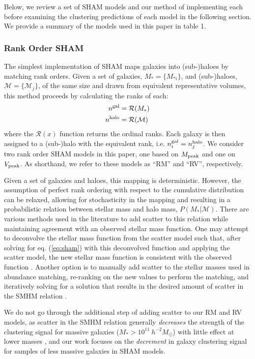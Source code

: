 \documentclass[useAMS,fleqn,usenatbib]{mnras}
\begin{document}
Below, we review a set of SHAM models and our method of implementing each before examining the clustering predictions of each model in the following section.  We provide a summary of the models used in this paper in table 1.


\subsubsection{Rank Order SHAM}
\label{sec:rank_sham}

The simplest implementation of SHAM maps galaxies into (sub-)haloes by matching rank orders.  Given a set of galaxies, $M_*=\{M_{*i}\}$, and (sub-)haloes, $\mathcal{M}=\{\mathcal{M}_j\}$, of the same size and drawn from equivalent representative volumes, this method proceeds by calculating the ranks of each:
%
\begin{align}
n^{\rm gal} &= \mathcal{R}(M_*) \nonumber \\
n^{\rm halo} &= \mathcal{R}(\mathcal{M})
\end{align}
%
where the $\mathcal{R}(x)$ function returns the ordinal ranks.  Each galaxy is then assigned to a (sub-)halo with the equivalent rank, i.e. $n_i^{\rm gal}=n_j^{\rm halo}$.  We consider two rank order SHAM models in this paper, one based on $M_{\rm peak}$ and one on $V_{\rm peak}$.  As shorthand, we refer to these models as ``RM'' and ``RV'', respectively. 

Given a set of galaxies and haloes, this mapping is deterministic.  However, the assumption of perfect rank ordering with respect to the cumulative distribution can be relaxed, allowing for stochasticity in the mapping and resulting in a probabilistic relation between stellar mass and halo mass, $P(M_*|\mathcal{M})$.  There are various methods used in the literature to add scatter to this relation while maintaining agreement with an observed stellar mass function.  One may attempt to deconvolve the stellar mass function from the scatter model such that, after solving for eq. (\ref{eq:sham}) with this deconvolved function and applying the scatter model, the new stellar mass function is consistent with the observed function \citep[e.g.][]{Behroozi:2010ja}.  Another option is to manually add scatter to the stellar masses used in abundance matching, re-ranking on the new values to perform the matching, and iteratively solving for a solution that results in the desired amount of scatter in the SMHM relation \citep[e.g.][]{Hearin:2013ok}. 

We do not go through the additional step of adding scatter to our RM and RV models, as scatter in the SMHM relation generally \emph{decreases} the strength of the clustering signal for massive galaxies ($M_* > 10^{11} ~h^{-2} M_{\odot}$) with little effect at lower masses \citep{Tinker:2016vu}, and our work focuses on the \emph{decrement} in galaxy clustering signal for samples of less massive galaxies in SHAM models.
\end{document}
